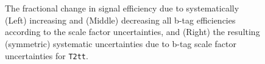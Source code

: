 \begin{figure}[h!]
  \begin{center}
    \\
    \\
    \caption{\label{fig:sms-btag-t2tt}The fractional change in signal
      efficiency due to systematically (Left) increasing and (Middle)
      decreasing all b-tag efficiencies according to the scale factor
      uncertainties, and (Right) the resulting (symmetric) systematic
      uncertainties due to b-tag scale factor uncertainties for
      \texttt{T2tt}.} 
  \end{center}
\end{figure}


